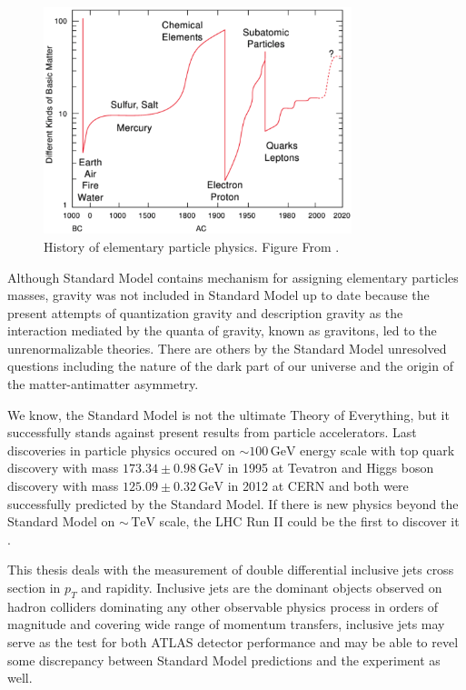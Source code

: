 \documentclass[a4paper,11pt,twoside,openright]{book}
\newcommand{\TeV}{\,\text{TeV}}
\newcommand{\GeV}{\,\text{GeV}}
\newcommand{\pt}{p_{T}}
\begin{document}
\begin{figure}[t]
  \centering
  \includegraphics[width=0.8\textwidth]{Introduction/HistoryOfElementaryParticlePhysics.png}
  \caption{History of elementary particle physics. Figure From
    \cite{LatticeQCDForPedestrians}.}
  \label{fig:HistoryOfElPartPhysics}
\end{figure}

Although Standard Model contains mechanism for assigning elementary particles
masses, gravity was not included in Standard Model up to date because the
present attempts of quantization gravity and description gravity as the
interaction mediated by the quanta of gravity, known as gravitons, led to the
unrenormalizable theories. There are others by the Standard Model unresolved
questions including the nature of the dark part of our universe and the origin
of the matter-antimatter asymmetry. 

We know, the Standard Model is not the ultimate Theory of Everything,
but it successfully stands against present results from particle accelerators.  Last
discoveries in particle physics occured on $\sim 100\GeV$ energy scale with top
quark discovery \cite{TopQuark1,TopQuark2} with mass $173.34 \pm 0.98 \GeV$ in
1995 at Tevatron and Higgs boson discovery \cite{HiggsDiscovery} with mass
$125.09 \pm 0.32 \GeV$ in 2012 at CERN and both were successfully predicted by
the Standard Model. If there is new physics beyond the Standard Model on $\sim
\TeV$ scale, the LHC Run II could be the first to discover it
\cite{PhysicsAtRun2LHC}. 

This thesis deals with the measurement of double differential inclusive jets 
cross section in $\pt$ and rapidity. Inclusive jets are the dominant objects
observed on hadron colliders dominating any other observable physics process in
orders of magnitude and covering wide range of momentum transfers, inclusive
jets may serve as the test for both ATLAS detector performance and may
be able to revel some discrepancy between Standard Model predictions and the
experiment as well.
\end{document}
